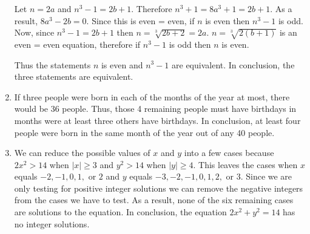 \documentclass[11pt]{article}
\begin{document}
\begin{enumerate}
Let $n = 2a$ and $n^3 - 1 = 2b + 1$. Therefore $n^3 + 1 = 8a^3 + 1 = 2b + 1$. As a result, $8a^3 - 2b = 0$. Since this is even = even, if $n$ is even then $n^3 - 1$ is odd.
Now, since $n^3 - 1 = 2b + 1$ then $n = \sqrt[3]{2b + 2} = 2a$. $n = \sqrt[3]{2(b+1)}$ is an even = even equation, therefore if $n^3 - 1$ is odd then $n$ is even.

Thus the statements $n$ is even and $n^3 -1$ are equivalent. In conclusion, the three statements are equivalent.

\item If three people were born in each of the months of the year at most, there would be 36 people. Thus, those 4 remaining people must have birthdays in months were at least three others have birthdays. In conclusion, at least four people were born in the same month of the year out of any 40 people.
\item We can reduce the possible values of $x$ and $y$ into a few cases because $2x^2 > 14$ when $|x|\geq 3$ and $y^2> 14$ when $|y| \geq 4$. This leaves the cases when $x$ equals $-2,-1,0,1,$ or $2$ and $y$ equals $-3, -2, -1, 0, 1, 2,$ or $3$. Since we are only testing for positive integer solutions we can remove the negative integers from the cases we have to test. As a result, none of the six remaining cases are solutions to the equation. In conclusion, the equation $2x^2+y^2=14$ has no integer solutions.
\end{enumerate}
\end{document}
